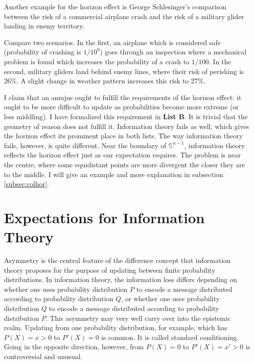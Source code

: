 \documentclass[smallextended]{svjour3}       %
\begin{document}
Another example for the horizon effect is George Schlesinger's
comparison between the risk of a commercial airplane crash and the
risk of a military glider landing in enemy territory.

\begin{quotex}
  \label{ex:schlesinger} Compare two
  scenarios. In the first, an airplane which is considered safe
  (probability of crashing is $1/10^{9}$) goes through an
  inspection where a mechanical problem is found which increases
  the probability of a crash to $1/100$. In the second, military
  gliders land behind enemy lines, where their risk of perishing
  is 26\%. A slight change in weather pattern increases this risk
  to 27\%. 
\end{quotex}

I claim that an amujus ought to fulfill the requirements of the
horizon effect: it ought to be more difficult to update as
probabilities become more extreme (or less middling). I have
formalized this requirement in \textbf{List B}. It is trivial that the
geometry of reason does not fulfill it. Information theory fails as
well, which gives the horizon effect its prominent place in both
lists. The way information theory fails, however, is quite different.
Near the boundary of $\mathbb{S}^{n-1}$, information theory reflects
the horizon effect just as our expectation requires. The problem is
near the centre, where some equidistant points are more divergent the
closer they are to the middle. I will give an example and more
explanation in subsection \ref{subsec:colhor}.

\section{Expectations for Information Theory}
\label{sec:expinfth}

Asymmetry is the central feature of the difference concept that
information theory proposes for the purpose of updating between finite
probability distributions. In information theory, the information loss
differs depending on whether one uses probability distribution $P$ to
encode a message distributed according to probability distribution
$Q$, or whether one uses probability distribution $Q$ to encode a
message distributed according to probability distribution $P$. This
asymmetry may very well carry over into the epistemic realm. Updating
from one probability distribution, for example, which has $P(X)=x>0$
to $P'(X)=0$ is common. It is called standard conditioning. Going in
the opposite direction, however, from $P(X)=0$ to $P'(X)=x'>0$ is
controversial and unusual.
\end{document}
